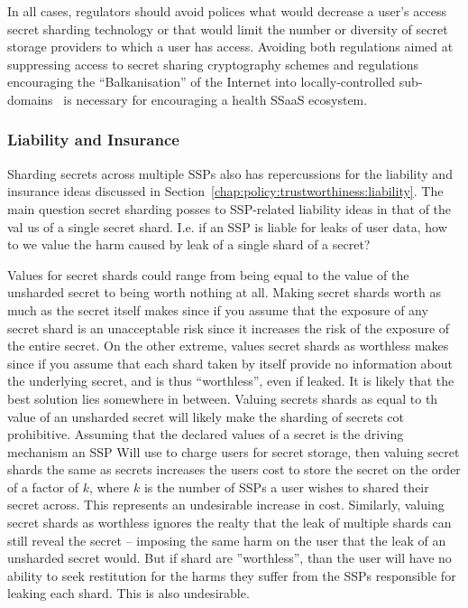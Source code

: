 In all cases, regulators should avoid polices what would decrease a
user's access secret sharding technology or that would limit the
number or diversity of secret storage providers to which a user has
access. Avoiding both regulations aimed at suppressing access to
secret sharing cryptography schemes and regulations encouraging the
``Balkanisation'' of the Internet into locally-controlled
sub-domains~\cite{lee2014} is necessary for encouraging a health SSaaS
ecosystem.

\subsubsection{Liability and Insurance}

Sharding secrets across multiple SSPs also has repercussions for the
liability and insurance ideas discussed in
Section~\ref{chap:policy:trustworthiness:liability}. The main question
secret sharding posses to SSP-related liability ideas in that of the
val us of a single secret shard. I.e. if an SSP is liable for leaks of
user data, how to we value the harm caused by leak of a single shard
of a secret?

Values for secret shards could range from being equal to the value of
the unsharded secret to being worth nothing at all. Making secret
shards worth as much as the secret itself makes since if you assume
that the exposure of any secret shard is an unacceptable risk since it
increases the risk of the exposure of the entire secret. On the other
extreme, values secret shards as worthless makes since if you assume
that each shard taken by itself provide no information about the
underlying secret, and is thus ``worthless'', even if leaked. It is
likely that the best solution lies somewhere in between. Valuing
secrets shards as equal to th value of an unsharded secret will likely
make the sharding of secrets cot prohibitive. Assuming that the
declared values of a secret is the driving mechanism an SSP Will use
to charge users for secret storage, then valuing secret shards the
same as secrets increases the users cost to store the secret on the
order of a factor of $k$, where $k$ is the number of SSPs a user
wishes to shared their secret across. This represents an undesirable
increase in cost. Similarly, valuing secret shards as worthless
ignores the realty that the leak of multiple shards can still reveal
the secret -- imposing the same harm on the user that the leak of an
unsharded secret would. But if shard are ''worthless'', than the user
will have no ability to seek restitution for the harms they suffer
from the SSPs responsible for leaking each shard. This is also
undesirable.

